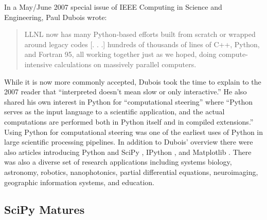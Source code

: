 \documentclass[fleqn,10pt]{wlscirep}
\begin{document}
In a May/June 2007 special issue of IEEE Computing in Science and
Engineering, Paul Dubois wrote\cite{dubois2007guest}:
\begin{quote}
LLNL now has many Python-based efforts built from scratch or wrapped around
legacy codes [. . .] hundreds of thousands
of lines of C++, Python, and Fortran 95, all working together just as we hoped,
doing compute-intensive calculations on massively parallel computers.
\end{quote}
While it is now more commonly accepted, Dubois took the time to explain to
the 2007 reader that ``interpreted doesn't mean slow or only interactive.''
He also shared his own interest in Python for ``computational steering''
where ``Python serves as the input language to a scientific application, and the actual
computations are performed both in Python itself and in compiled extensions.''
Using Python for computational steering was one of the earliest uses of Python
in large scientific processing pipelines.
In addition to Dubois' overview there were also articles introducing
Python and SciPy \cite{oliphant2007python}, IPython \cite{perez2007ipython},
and  Matplotlib \cite{hunter2007matplotlib}.
There was also a diverse set of
research applications including
systems biology\cite{myers2007python},
astronomy\cite{greenfield2007reaching},
robotics\cite{krauss2007python},
nanophotonics\cite{bienstman2007python},
partial differential equations\cite{mardal2007using},
neuroimaging\cite{millman2007analysis},
geographic information systems\cite{shi2007python}, and
education\cite{backer2007computational, myers2007pythona}.


\subsection*{SciPy Matures}
\end{document}

